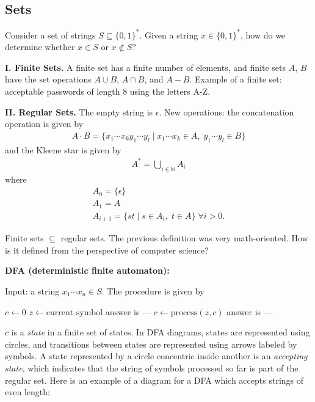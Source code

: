 \documentclass[a4paper,12pt]{article}
\theoremstyle{remark}
\theoremstyle{definition}
\begin{document}
\subsection*{Sets}
Consider a set of strings $S \subseteq \{ 0, 1 \}^*$. Given a string $x \in \{ 0, 1 \}^*$, how do we determine whether $x \in S$ or $x \notin S$? \par
\textbf{I. Finite Sets.} A finite set has a finite number of elements, and finite sets $A$, $B$ have the set operations $A \cup B$, $A \cap B$, and $A - B$. Example of a finite set: acceptable passwords of length 8 using the letters A-Z. \par
\textbf{II. Regular Sets.} The empty string is $\epsilon$. New operations: the concatenation operation is given by
\begin{align*}
    A \cdot B = \{ x_1 \cdots x_k y_1 \cdots y_l \mid x_1 \cdots x_k \in A, \; y_1 \cdots y_l \in B \}
\end{align*}
and the Kleene star is given by
\begin{align*}
    A^* = \bigcup_{i \in \mathbb{N}} A_i
\end{align*}
where
\begin{gather*}
    A_0 = \{ \epsilon \} \\
    A_1 = A \\
    A_{i + 1} = \{ st \mid s \in A_i, \; t \in A \} \; \forall i > 0.
\end{gather*} \par
Finite sets $\subseteq$ regular sets. The previous definition was very math-oriented. How is it defined from the perspective of computer science? \par
\textbf{DFA (deterministic finite automaton):} \par
Input: a string $x_1 \cdots x_n \in S$. The procedure is given by
\begin{algorithm}[H] {\begin{algorithmic}[1]
    \State $c \leftarrow 0$
    \Loop
        \State $z \leftarrow \text{current symbol}$
            \State answer is ---
        \EndIf
        \State $c \leftarrow \text{process}(z, c)$
    \EndLoop
    \State answer is ---
\end{algorithmic}} \end{algorithm}
$c$ is a \emph{state} in a finite set of states. In DFA diagrams, states are represented using circles, and transitions between states are represented using arrows labeled by symbols. A state represented by a circle concentric inside another is an \emph{accepting state}, which indicates that the string of symbols processed so far is part of the regular set. Here is an example of a diagram for a DFA which accepts strings of even length:
\end{document}
